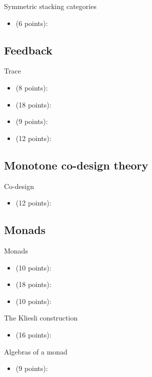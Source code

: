 Symmetric stacking categories
\begin{itemize}
    \item {} (6 points): 
\end{itemize}

\subsection{Feedback}

Trace
\begin{itemize}
    \item {} (8 points): 
    \item {} (18 points): 
    \item {} (9 points): 
    \item {} (12 points): 
\end{itemize}

\subsection{Monotone co-design theory}

Co-design

\begin{itemize}
    \item {} (12 points): 
\end{itemize}

\subsection{Monads}

Monads
\begin{itemize}
    \item {} (10 points): 
    \item {} (18 points): 
    \item {} (10 points): 
\end{itemize}
The Kliesli construction
\begin{itemize}
    \item {} (16 points): 
\end{itemize}
Algebras of a monad
\begin{itemize}
    \item {} (9 points): 
\end{itemize}


